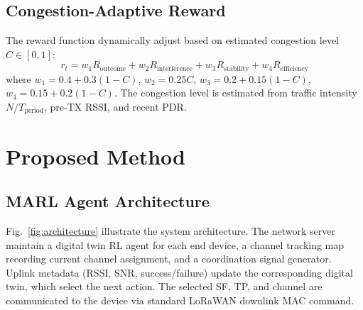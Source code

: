 \documentclass[conference]{IEEEtran}
\begin{document}
\subsection{Congestion-Adaptive Reward}

The reward function dynamically adjust based on estimated congestion level $C \in [0, 1]$:
\begin{equation}
    r_t = w_1 R_{\text{outcome}} + w_2 R_{\text{interference}} + w_3 R_{\text{stability}} + w_4 R_{\text{efficiency}}
\end{equation}
where $w_1 = 0.4 + 0.3(1-C)$, $w_2 = 0.25C$, $w_3 = 0.2 + 0.15(1-C)$, $w_4 = 0.15 + 0.2(1-C)$. The congestion level is estimated from traffic intensity $N/T_{\text{period}}$, pre-TX RSSI, and recent PDR.

\section{Proposed Method}
\label{sec:method}

\subsection{MARL Agent Architecture}

Fig.~\ref{fig:architecture} illustrate the system architecture. The network server maintain a digital twin RL agent for each end device, a channel tracking map recording current channel assignment, and a coordination signal generator. Uplink metadata (RSSI, SNR, success/failure) update the corresponding digital twin, which select the next action. The selected SF, TP, and channel are communicated to the device via standard LoRaWAN downlink MAC command.
\end{document}
